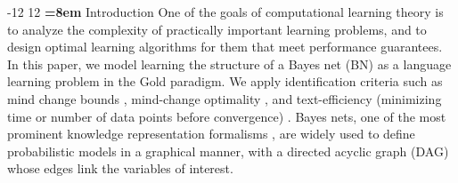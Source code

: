 \documentclass{elsarticle}%
\makeatletter
\renewcommand\section{\@startsection {section}{1}{\z@}%
  {-12\p@ \@plus -4\p@ \@minus -4\p@}%
                       {12\p@ \@plus 4\p@ \@minus 4\p@}%
                                   {\normalfont\large\bfseries\boldmath
                                   \rightskip=\z@ \@plus 8em\pretolerance=10000 }}
\makeatother
\begin{document}
\section{Introduction}
One of the goals of computational learning theory is to analyze the complexity of practically important learning problems, and to design optimal learning algorithms for them that meet performance guarantees. In this paper, we model learning the structure of a Bayes net (BN) as a language learning problem in the Gold paradigm. We apply identification criteria such as mind change bounds
\cite[Ch. 12.2]{jain99:_system_that_learn}\cite{putnam65:_trial_error_predic_solut_probl_mostow},
mind-change optimality \cite{luo05:_mind_chang_effic_learn,luo06:_mind_chang_effic_learn},
and text-efficiency
(minimizing time or number of data points before convergence) \cite{Osherson86,gold67limit}.
Bayes nets, one of the most prominent knowledge representation formalisms
\cite{pearl88:_probab_reason_intel_system,pearl00:_causal,jensen02:_bayes_networ_decis_graph,cowell05:_probab_networ_exper_system},
are widely used to define probabilistic models in a graphical manner,
with a directed acyclic graph (DAG) whose edges link the variables of interest. 
\end{document}
